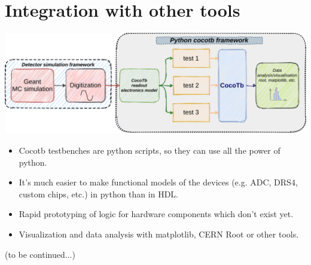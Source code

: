 \documentclass[aspectratio=169]{beamer}
\begin{document}
\section*{Integration with other tools}
\begin{frame}{\secname}

  \includegraphics[width=1.0\textwidth]{figs/cocotb_integration.pdf}

  \vspace*{-3mm}
  \begin{itemize}
    \item Cocotb testbenches are python scripts, so they can use all the power of python. 
    \item It's much easier to make functional models of the devices 
      (e.g. ADC, DRS4, custom chips, etc.) in python than in HDL. 
    \item Rapid prototyping of logic for hardware components which don't exist yet. 
    \item Visualization and data analysis with matplotlib, CERN Root or other tools. 
  \end{itemize}
  
   \centering
   (to be continued...)
\end{frame}

\end{document}
